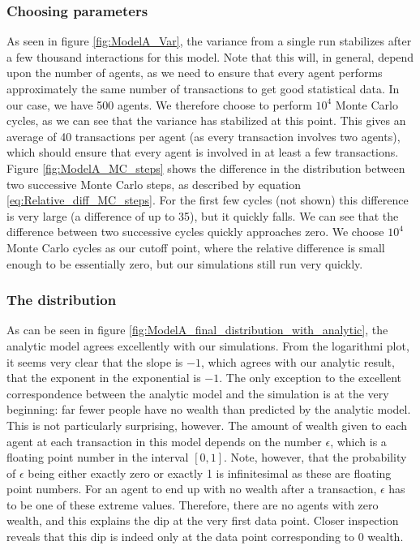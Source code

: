 \documentclass[a4paper, 10pt]{article}
\begin{document}
\subsubsection{Choosing parameters}
As seen in figure \ref{fig:ModelA_Var}, the variance from a single run stabilizes after a few thousand interactions for this model. Note that this will, in general, depend upon the number of agents, as we need to ensure that every agent performs approximately the same number of transactions to get good statistical data. In our case, we have 500 agents. We therefore choose to perform $10^4$ Monte Carlo cycles, as we can see that the variance has stabilized at this point. This gives an average of 40 transactions per agent (as every transaction involves two agents), which should ensure that every agent is involved in at least a few transactions.\\
\linebreak
Figure \ref{fig:ModelA_MC_steps} shows the difference in the distribution between two successive Monte Carlo steps, as described by equation \ref{eq:Relative_diff_MC_steps}. For the first few cycles (not shown) this difference is very large (a difference of up to 35), but it quickly falls. We can see that the difference between two successive cycles quickly approaches zero. We choose $10^4$ Monte Carlo cycles as our cutoff point, where the relative difference is small enough to be essentially zero, but our simulations still run very quickly.
\subsubsection{The distribution}
As can be seen in figure \ref{fig:ModelA_final_distribution_with_analytic}, the analytic model agrees excellently with our simulations. From the logarithmi plot, it seems very clear that the slope is $-1$, which agrees with our analytic result, that the exponent in the exponential is $-1$. The only exception to the excellent correspondence between the analytic model and the simulation is at the very beginning: far fewer people have no wealth than predicted by the analytic model. This is not particularly surprising, however. The amount of wealth given to each agent at each transaction in this model depends on the number $\epsilon$, which is a floating point number in the interval $[0,1]$. Note, however, that the probability of $\epsilon$ being either exactly zero or exactly 1 is infinitesimal as these are floating point numbers. For an agent to end up with no wealth after a transaction, $\epsilon$ has to be one of these extreme values. Therefore, there are no agents with zero wealth, and this explains the dip at the very first data point. Closer inspection reveals that this dip is indeed only at the data point corresponding to 0 wealth.
\end{document}
